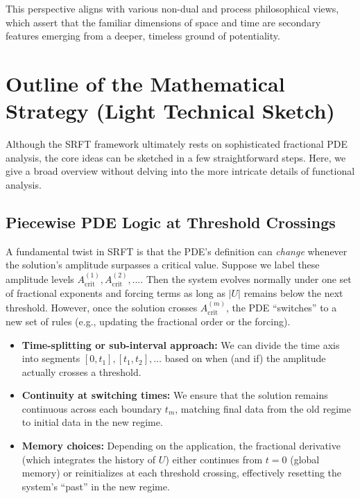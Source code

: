 \documentclass[12pt]{article}
\begin{document}
This perspective aligns with various non-dual and process philosophical views, which assert that the familiar dimensions of space and time are secondary features emerging from a deeper, timeless ground of potentiality.


\section{Outline of the Mathematical Strategy (Light Technical Sketch)}
\label{sec:math_strategy}

Although the SRFT framework ultimately rests on sophisticated fractional PDE
analysis, the core ideas can be sketched in a few straightforward steps. Here,
we give a broad overview without delving into the more intricate details of
functional analysis.

\subsection{Piecewise PDE Logic at Threshold Crossings}
A fundamental twist in SRFT is that the PDE’s definition can \emph{change}
whenever the solution’s amplitude surpasses a critical value. Suppose we
label these amplitude levels $A_{\mathrm{crit}}^{(1)}, A_{\mathrm{crit}}^{(2)},\dots$.
Then the system evolves normally under one set of fractional exponents and
forcing terms as long as $|U|$ remains below the next threshold. However, once
the solution crosses $A_{\mathrm{crit}}^{(m)}$, the PDE “switches” to a new set
of rules (e.g., updating the fractional order or the forcing). 

\begin{itemize}
    \item \textbf{Time-splitting or sub-interval approach:} We can divide the
          time axis into segments $[0, t_1], [t_1, t_2], \dots$ based on
          when (and if) the amplitude actually crosses a threshold.
    \item \textbf{Continuity at switching times:} We ensure that the solution
          remains continuous across each boundary $t_m$, matching final
          data from the old regime to initial data in the new regime.
    \item \textbf{Memory choices:} Depending on the application, the fractional
          derivative (which integrates the history of $U$) either continues
          from $t=0$ (global memory) or reinitializes at each threshold crossing,
          effectively resetting the system’s “past” in the new regime.
\end{itemize}
\end{document}
